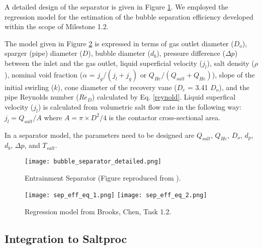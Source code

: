     A detailed design of the separator is given in Figure 
    \ref{fig:bubble_sprt}. We employed the regression model for the estimation 
    of the bubble separation efficiency developed within the scope of Milestone 
    1.2.

    The model given in Figure \ref{fig:reg_model} is expressed in terms of gas 
    outlet diameter ($D_o$), sparger (pipe) diameter ($D$), bubble diameter 
    ($d_b$), pressure difference ($\Delta p$) between the inlet and the gas 
    outlet, liquid superficial velocity ($j_l$), salt density ($\rho$), nominal 
    void fraction ($\alpha$ = $j_g/(j_{l}+j_{g})$ or 
    $Q_{He}/(Q_{salt}+Q_{He})$), slope of the initial swirling ($k$), cone 
    diameter of the recovery vane ($D_c$ = 3.41 $D_o$), and the pipe Reynolds 
    number ($Re_D$) calculated by Eq. \ref{reynold}. Liquid superfical velocity 
    ($j_l$) is calculated from volumetric salt flow rate in the following way: 
    $j_l = Q_{salt}/A$ where $A = \pi\times D^2/4$ is the contactor 
    cross-sectional area.

    In a separator model, the parameters need to be designed are $Q_{salt}$, 
    $Q_{He}$, $D_o$, $d_p$, $d_b$, $\Delta p$, and $T_{salt}$.

    \begin{figure}[htbp!]
        \begin{center}
            \texttt{[image: bubble\_separator\_detailed.png]}
        \end{center}
            \caption{Entrainment Separator (Figure reproduced from 
            \cite{peebles_removal_1968,gabbard_development_1979}).}
        \label{fig:bubble_sprt}
    \end{figure}

    \begin{figure}[htbp!]
        \begin{center}
            \texttt{[image: sep\_eff\_eq\_1.png]}
            \texttt{[image: sep\_eff\_eq\_2.png]}
        \end{center}
        \caption{Regression model from Brooks, Chen, Task 1.2.}
        \label{fig:reg_model}
    \end{figure}

\FloatBarrier

\subsection{Integration to Saltproc}

